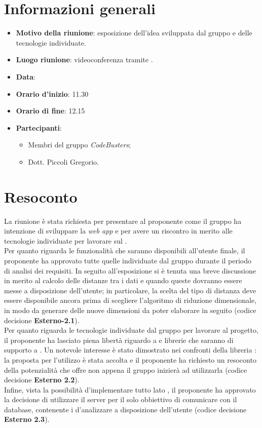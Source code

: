 \section{Informazioni generali}
\begin{itemize}
\item \textbf{Motivo della riunione}: esposizione dell'idea sviluppata dal gruppo e delle tecnologie individuate.
\item \textbf{Luogo riunione}: videoconferenza tramite .
\item \textbf{Data}: \Data{}
\item \textbf{Orario d'inizio}: 11.30 
\item \textbf{Orario di fine}: 12.15 
\item \textbf{Partecipanti}:
	\begin{itemize}
	\item Membri del gruppo \textit{CodeBusters};
	\item Dott. Piccoli Gregorio.
	\end{itemize}
\end{itemize}

\section{Resoconto}
La riunione è stata richiesta per presentare al proponente come il gruppo ha intenzione di sviluppare la \textit{web app}\glo{} e per avere un riscontro in merito alle tecnologie individuate per lavorare sul . \\
Per quanto riguarda le funzionalità che saranno disponibili all'utente finale, il proponente ha approvato tutte quelle individuate dal gruppo durante il periodo di analisi dei requisiti. In seguito all'esposizione si è tenuta una breve discussione in merito al calcolo delle distanze tra i dati e quando queste dovranno essere messe a disposizione dell'utente; in particolare, la scelta del tipo di distanza deve essere disponibile ancora prima di scegliere l'algoritmo di riduzione dimensionale, in modo da generare delle nuove dimensioni da poter elaborare in seguito (codice decisione \textbf{Esterno-2.1}). \\
Per quanto riguarda le tecnologie individuate dal gruppo per lavorare al progetto, il proponente ha lasciato piena libertà riguardo a  e librerie che saranno di supporto a . Un notevole interesse è stato dimostrato nei confronti della libreria : la proposta per l'utilizzo è stata accolta e il proponente ha richiesto un resoconto della potenzialità che offre non appena il gruppo inizierà ad utilizzarla (codice decisione \textbf{Esterno 2.2}). \\
Infine, vista la possibilità d'implementare tutto lato , il proponente ha approvato la decisione di utilizzare il server per il solo obbiettivo di comunicare con il database, contenente i  d'analizzare a disposizione dell'utente (codice decisione \textbf{Esterno 2.3}).